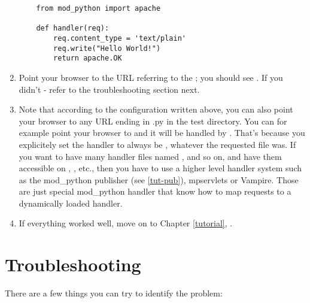 \begin{enumerate}
  \begin{verbatim}
    from mod_python import apache

    def handler(req):
        req.content_type = 'text/plain'
        req.write("Hello World!")
        return apache.OK 
  \end{verbatim}

\item
  Point your browser to the URL referring to the ;
  you should see . If you didn't - refer to the
  troubleshooting section next.

\item
  Note that according to the configuration written above, you can
  also point your browser to any URL ending in .py in the test directory.
  You can for example point your browser to 
  and it will be handled by . That's because you
  explicitely set the handler to always be , whatever the
  requested file was. If you want to have many handler files named
  , 
  and so on, and have them accessible on ,
  , etc., then you have to use a higher level
  handler system such as the mod_python publisher (see \ref{tut-pub}),
  mpservlets or Vampire. Those are just special mod_python handler
  that know how to map requests to a dynamically loaded handler.

\item
  If everything worked well, move on to Chapter \ref{tutorial}, 
  . 

\end{enumerate}

\begin{seealso}
\end{seealso}

\section{Troubleshooting\label{inst-trouble}}

There are a few things you can try to identify the problem: 

